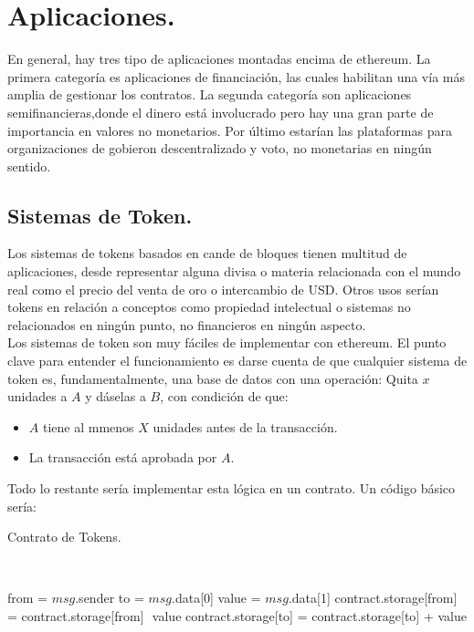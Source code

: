 \documentclass[11pt,a4paper]{article}
\begin{document}
\section {Aplicaciones.} 
En general, hay tres tipo de aplicaciones montadas encima de ethereum. La primera categoría es aplicaciones de financiación, las cuales habilitan una vía más amplia de gestionar los contratos. La segunda categoría son aplicaciones semifinancieras,donde el dinero está involucrado pero hay una gran parte de importancia en valores no monetarios. Por último estarían las plataformas para organizaciones de gobieron descentralizado y voto, no monetarias en ningún sentido.

\subsection{Sistemas de Token.}

Los sistemas de tokens basados en cande de bloques tienen multitud de aplicaciones, desde representar alguna divisa o materia relacionada con el mundo real como el precio del venta de oro o intercambio de USD. Otros usos serían tokens en relación a conceptos como propiedad intelectual o sistemas no relacionados en ningún punto, no financieros en ningún aspecto. \\

Los sistemas de token son muy fáciles de implementar con ethereum. El punto clave para entender el funcionamiento es darse cuenta de que cualquier sistema de token es, fundamentalmente, una base de datos con una operación: Quita $x$ unidades a $A$ y dáselas a $B$, con condición de que:
\begin{itemize}
\item $A$ tiene al mmenos $X$ unidades antes de la transacción.
\item La transacción está aprobada por $A$. 
\end{itemize}

Todo lo restante sería implementar esta lógica en un contrato. Un código básico sería:\\


\begin{algorithm}
  \caption{Contrato de Tokens.}\label{token}
  \begin{algorithmic}[1]
    			\\ 
    
    \State from = $msg$.sender
    \State to = $msg$.data[0]
    \State value = $msg$.data[1]
    \State contract.storage[from] = contract.storage[from] ­ value
    \State contract.storage[to] = contract.storage[to] + value
    \EndIf
    \EndProcedure
  \end{algorithmic}
\end{algorithm}
\end{document}
